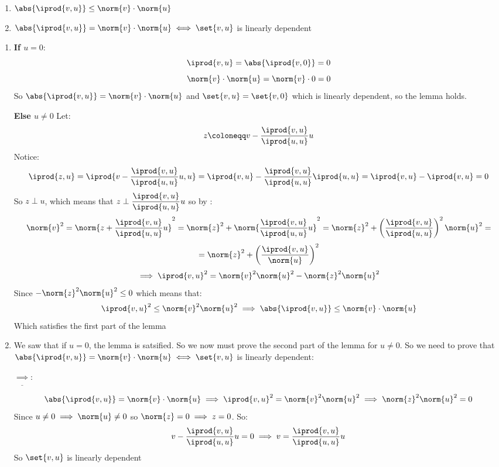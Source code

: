 \documentclass[10pt]{article}
\begin{document}
\begin{lemma}{\begin{enumerate}
    \item $\abs{\iprod{v,u}}\leq\norm{v}\cdot\norm{u}$
    \item $\abs{\iprod{v,u}}=\norm{v}\cdot\norm{u}\iff\set{v,u}$ is linearly dependent
\end{enumerate}}

\begin{enumerate}
    \item \textbf{If $u=0$}: 
    \[ \iprod{v,u} = \abs{\iprod{v,0}} = 0 \]
    \[ \norm{v}\cdot\norm{u}=\norm{v}\cdot0=0 \]
    So $\abs{\iprod{v,u}}=\norm{v}\cdot\norm{u}$ and $\set{v,u}=\set{v,0}$ which is linearly dependent, so the lemma holds.
     
    \textbf{Else $u\neq0$} Let:
    \[ z\coloneqq v-\dfrac{\iprod{v,u}}{\iprod{u,u}}u \]
    Notice:
    \[ \iprod{z,u} = \iprod{v-\dfrac{\iprod{v,u}}{\iprod{u,u}}u, u} = \iprod{v,u} - \dfrac{\iprod{v,u}}{\iprod{u,u}}\iprod{u,u} = \iprod{v,u}-\iprod{v,u} = 0 \]
    So $z\perp u$, which means that $z\perp\dfrac{\iprod{v,u}}{\iprod{u,u}}u$ so by :
    \[ \norm{v}^2 = \norm{z+\dfrac{\iprod{v,u}}{\iprod{u,u}}u}^2 = \norm{z}^2 + \norm{\dfrac{\iprod{v,u}}{\iprod{u,u}}u}^2 = \norm{z}^2 + \left(\dfrac{\iprod{v,u}}{\iprod{u,u}}\right)^2\norm{u}^2 = \]
    \[ = \norm{z}^2 + \left(\dfrac{\iprod{v,u}}{\norm{u}}\right)^2 \]
    \[ \implies \iprod{v,u}^2 = \norm{v}^2\norm{u}^2 - \norm{z}^2\norm{u}^2 \]
    Since $-\norm{z}^2\norm{u}^2\leq0$ which means that:
    \[ \iprod{v,u}^2 \leq \norm{v}^2\norm{u}^2 \implies \abs{\iprod{v,u}}\leq \norm{v}\cdot\norm{u} \]
    Which satisfies the first part of the lemma
    
    \item We saw that if $u=0$, the lemma is satsified. So we now must prove the second part of the lemma for $u\neq 0$. So we need to prove that $\abs{\iprod{v,u}}=\norm{v}\cdot\norm{u}\iff\set{v,u}$ is linearly dependent:
    
    $\underline{\implies}$: \begin{minipage}[t]{\dimexpr\textwidth-3cm}
    
    \[ \abs{\iprod{v,u}}=\norm{v}\cdot\norm{u} \implies \iprod{v,u}^2=\norm{v}^2\norm{u}^2 \implies \norm{z}^2\norm{u}^2=0 \]
    Since $u\neq0\implies\norm{u}\neq0$ so $\norm{z}=0\implies z=0$. So:
    \[ v-\dfrac{\iprod{v,u}}{\iprod{u,u}}u = 0 \implies v = \dfrac{\iprod{v,u}}{\iprod{u,u}}u \]
    So $\set{v,u}$ is linearly dependent
    

\end{minipage}
\end{enumerate}
\end{lemma}
\end{document}
